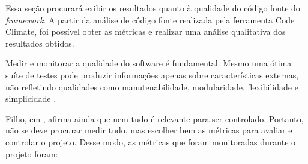 Essa seção procurará exibir os resultados quanto à qualidade do código fonte do \textit{framework}. A partir da análise de código fonte realizada pela ferramenta Code Climate, foi possível obter as métricas e realizar uma análise qualitativa dos resultados obtidos.

Medir e monitorar a qualidade do software é fundamental. Mesmo uma ótima suíte de testes pode produzir informações apenas sobre características externas, não refletindo qualidades como manutenabilidade, modularidade, flexibilidade e simplicidade \cite{Filho:2013}.

Filho, em \cite{Filho:2013}, afirma ainda que nem tudo é relevante para ser controlado. Portanto, não se deve procurar medir tudo, mas escolher bem as métricas para avaliar e controlar o projeto. Desse modo, as métricas que foram monitoradas durante o projeto foram:

